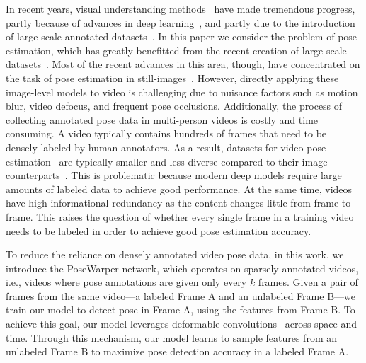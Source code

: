 \documentclass{article}
\begin{document}
In recent years, visual understanding methods~\cite{gberta_2015_CVPR,xie2016groups,DBLP:journals/corr/ToshevS13,gberta_2017_CVPR,SPP,he2017maskrcnn,lin2017focal,ren2015faster,girshick15fastrcnn,girshick2014rcnn,guptaECCV14,44872,dai16rfcn,DBLP:journals/corr/RedmonDGF15,DBLP:journals/corr/RedmonF16} have made tremendous progress, partly because of advances in deep learning~\cite{NIPS2012_4824,43022,Simonyan14c,He2016DeepRL}, and partly due to the introduction of large-scale annotated datasets~\cite{imagenet_cvpr09,coco_paper}. In this paper we consider the problem of pose estimation, which has greatly benefitted from the recent creation of large-scale datasets~\cite{Iqbal_CVPR2017,xiao2018simple}. Most of the recent advances in this area, though, have concentrated on the task of pose estimation in still-images~\cite{DBLP:journals/corr/ToshevS13,xiao2018simple,cao2017realtime,DBLP:conf/eccv/NewellYD16,DBLP:conf/cvpr/WeiRKS16,sun2019deep}.  However, directly applying these image-level models to video is challenging due to nuisance factors such as motion blur, video defocus, and frequent pose occlusions. Additionally, the process of collecting annotated pose data in multi-person videos is costly and time consuming. A video typically contains hundreds of frames that need to be densely-labeled by human annotators. As a result, datasets for video pose estimation~\cite{Iqbal_CVPR2017} are typically smaller and less diverse compared to their image counterparts~\cite{coco_paper}. This is problematic because modern deep models require large amounts of labeled data to achieve good performance. At the same time, videos have high informational redundancy as the content changes little from frame to frame. This raises the question of whether every single frame in a training video needs to be labeled in order to achieve good pose estimation accuracy.





To reduce the reliance on densely annotated video pose data, in this work, we introduce the PoseWarper network, which operates on sparsely annotated videos, i.e., videos where pose annotations are given only every $k$ frames. Given a pair of frames from the same video---a labeled Frame A and an unlabeled Frame B---we train our model to detect pose in Frame A, using the features from Frame B. To achieve this goal, our model leverages deformable convolutions~\cite{8237351} across space and time. Through this mechanism, our model learns to sample features from an unlabeled Frame B to maximize pose detection accuracy in a labeled Frame A. 
\end{document}
